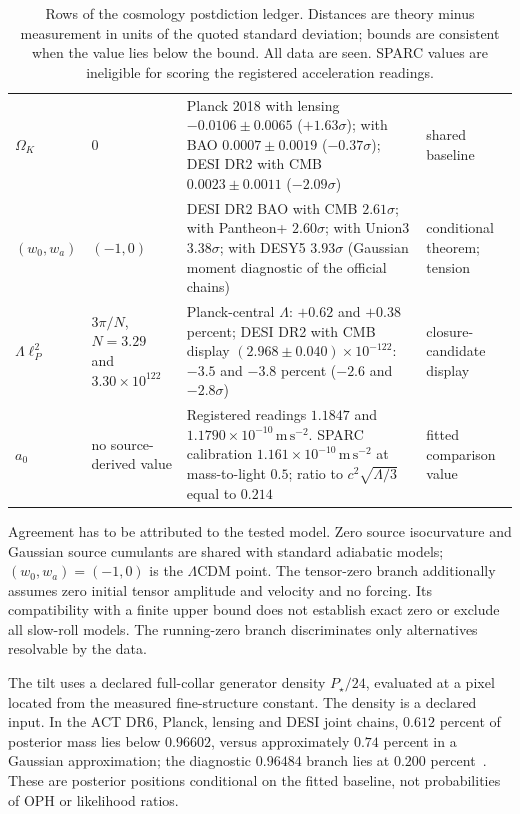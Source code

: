 \documentclass[11pt]{article}
\begin{document}
\begin{table}[!htbp]
\begin{tabularx}{\textwidth}{@{}l>{\raggedright\arraybackslash}p{}>{\raggedright\arraybackslash}X>{\raggedright\arraybackslash}p{}@{}}
\(\Omega_K\) & \(0\) &
Planck 2018 with lensing \(-0.0106\pm0.0065\) (\(+1.63\sigma\)); with BAO
\(0.0007\pm0.0019\) (\(-0.37\sigma\)); DESI DR2 with CMB
\(0.0023\pm0.0011\) (\(-2.09\sigma\)) &
shared baseline \\
\((w_0,w_a)\) & \((-1,0)\) &
DESI DR2 BAO with CMB \(2.61\sigma\); with Pantheon+ \(2.60\sigma\); with
Union3 \(3.38\sigma\); with DESY5 \(3.93\sigma\) (Gaussian moment
diagnostic of the official chains) &
conditional theorem; tension \\
\(\Lambda\ell_P^2\) & \(3\pi/N\), \(N=3.29\) and \(3.30\times10^{122}\) &
Planck-central \(\Lambda\): \(+0.62\) and \(+0.38\) percent; DESI DR2 with
CMB display \((2.968\pm0.040)\times10^{-122}\): \(-3.5\) and \(-3.8\)
percent (\(-2.6\) and \(-2.8\sigma\)) &
closure-candidate display \\
\(a_0\) & no source-derived value &
Registered readings \(1.1847\) and \(1.1790\times10^{-10}\,\mathrm{m\,s^{-2}}\).
SPARC calibration \(1.161\times10^{-10}\,\mathrm{m\,s^{-2}}\) at
mass-to-light \(0.5\); ratio to \(c^2\sqrt{\Lambda/3}\) equal to \(0.214\) &
fitted comparison value \\
\bottomrule
\end{tabularx}
\caption{Rows of the cosmology postdiction ledger. Distances are theory
minus measurement in units of the quoted standard deviation; bounds are
consistent when the value lies below the bound. All data are seen. SPARC
values are ineligible for scoring the registered acceleration readings.}
\label{tab:ledger}
\end{table}
\clearpage

Agreement has to be attributed to the tested model. Zero source
isocurvature and Gaussian source cumulants are shared with standard
adiabatic models; \((w_0,w_a)=(-1,0)\) is the \(\Lambda\)CDM point.
The tensor-zero branch additionally assumes zero initial tensor amplitude
and velocity and no forcing. Its compatibility with a finite upper bound
does not establish exact zero or exclude all slow-roll models. The
running-zero branch discriminates only alternatives resolvable by the data.

The tilt uses a declared full-collar generator density \(P_\star/24\),
evaluated at a pixel located from the measured fine-structure constant.
The density is a declared input. In the ACT DR6, Planck, lensing and DESI joint
chains, \(0.612\) percent of posterior mass lies below \(0.96602\),
versus approximately \(0.74\) percent in a Gaussian approximation; the
diagnostic \(0.96484\) branch lies at \(0.200\) percent~\cite{act2025,ophpublicdata}.
These are posterior positions conditional on the fitted baseline, not
probabilities of OPH or likelihood ratios.
\end{document}
